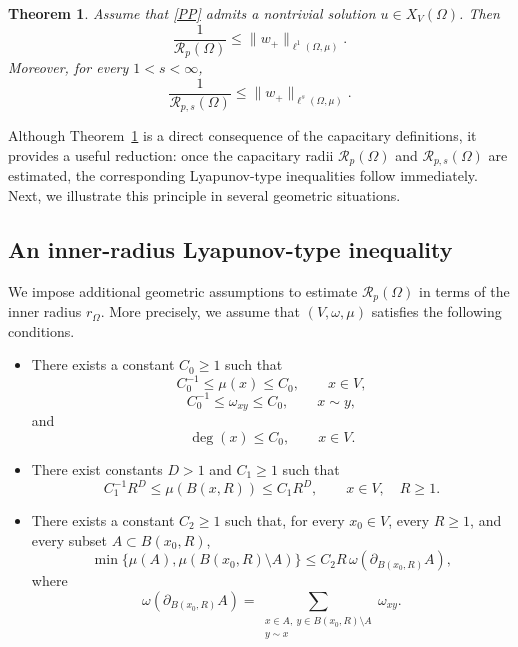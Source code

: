\documentclass[twoside,12pt,letter]{article}
\theoremstyle{plain}
\newtheorem{theorem}{Theorem}[section]
\theoremstyle{definition}
\theoremstyle{remark}
\numberwithin{equation}{section}
\begin{document}
\begin{theorem}\label{thm-cap-lyap}
Assume that \eqref{PP} admits a nontrivial solution
\(u\in X_V(\Omega)\). Then
\begin{equation}\label{Cap-Ly-ineq}
\frac{1}{\mathcal{R}_p(\Omega)}
\le
\|w_+\|_{\ell^1(\Omega,\mu)}.
\end{equation}
Moreover, for every \(1<s<\infty\),
\begin{equation}\label{Cap-Ly-ineq-s}
\frac{1}{\mathcal{R}_{p,s}(\Omega)}
\le
\|w_+\|_{\ell^s(\Omega,\mu)}.
\end{equation}
\end{theorem}

Although Theorem~\ref{thm-cap-lyap} is a direct consequence of the capacitary
definitions, it provides a useful reduction: once the capacitary radii
\(\mathcal{R}_p(\Omega)\) and \(\mathcal{R}_{p,s}(\Omega)\) are estimated, the
corresponding Lyapunov-type inequalities follow immediately. Next, we
illustrate this principle in several geometric situations.

\subsection{An inner-radius Lyapunov-type inequality}

We impose additional geometric assumptions to estimate
\(\mathcal{R}_p(\Omega)\) in terms of the inner radius \(r_\Omega\). More
precisely, we assume that \((V,\omega,\mu)\) satisfies the following conditions.

\begin{itemize}
\item[{\rm(G1)}] There exists a constant \(C_0\ge 1\) such that
\[
C_0^{-1}\le \mu(x)\le C_0,\qquad x\in V,
\]
\[
C_0^{-1}\le \omega_{xy}\le C_0,\qquad x\sim y,
\]
and
\[
\deg(x)\le C_0,\qquad x\in V.
\]

\item[{\rm(G2)}] There exist constants \(D>1\) and \(C_1\ge 1\) such that
\[
C_1^{-1}R^D\le \mu(B(x,R))\le C_1R^D,
\qquad x\in V,\quad R\ge 1.
\]

\item[{\rm(G3)}] There exists a constant \(C_2\ge 1\) such that, for every
\(x_0\in V\), every \(R\ge 1\), and every subset \(A\subset B(x_0,R)\),
\[
\min\{\mu(A),\mu(B(x_0,R)\setminus A)\}
\le C_2 R\,\omega(\partial_{B(x_0,R)}A),
\]
where
\[
\omega(\partial_{B(x_0,R)}A)
=
\sum_{\substack{x\in A,\ y\in B(x_0,R)\setminus A\\ y\sim x}}
\omega_{xy}.
\]
\end{itemize}
\end{document}

